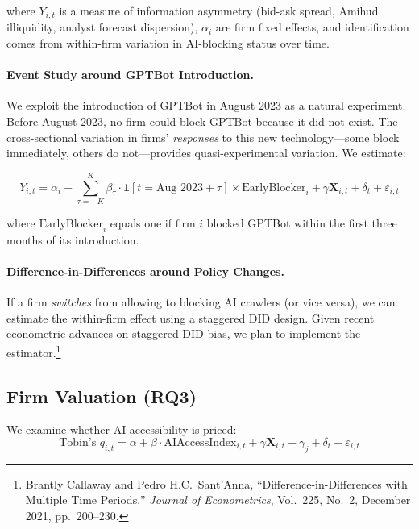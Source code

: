 \documentclass[12pt,a4paper]{article}
\begin{document}
\noindent where $Y_{i,t}$ is a measure of information asymmetry (bid-ask spread, Amihud illiquidity, analyst forecast dispersion), $\alpha_i$ are firm fixed effects, and identification comes from within-firm variation in AI-blocking status over time.

\paragraph{Event Study around GPTBot Introduction.}
We exploit the introduction of GPTBot in August 2023 as a natural experiment. Before August 2023, no firm could block GPTBot because it did not exist. The cross-sectional variation in firms' \emph{responses} to this new technology---some block immediately, others do not---provides quasi-experimental variation. We estimate:

\begin{equation}
Y_{i,t} = \alpha_i + \sum_{\tau = -K}^{K} \beta_\tau \cdot \mathbf{1}[t = \text{Aug 2023} + \tau] \times \text{EarlyBlocker}_{i} + \gamma \mathbf{X}_{i,t} + \delta_t + \varepsilon_{i,t}
\end{equation}

\noindent where $\text{EarlyBlocker}_{i}$ equals one if firm $i$ blocked GPTBot within the first three months of its introduction.

\paragraph{Difference-in-Differences around Policy Changes.}
If a firm \emph{switches} from allowing to blocking AI crawlers (or vice versa), we can estimate the within-firm effect using a staggered DID design. Given recent econometric advances on staggered DID bias, we plan to implement the \citet{CallawayS2021} estimator.\footnote{Brantly Callaway and Pedro H.C.\ Sant'Anna, ``Difference-in-Differences with Multiple Time Periods,'' \emph{Journal of Econometrics}, Vol.\ 225, No.\ 2, December 2021, pp.\ 200--230.}

\subsection{Firm Valuation (RQ3)}

We examine whether AI accessibility is priced:
\begin{equation}
\text{Tobin's } q_{i,t} = \alpha + \beta \cdot \text{AIAccessIndex}_{i,t} + \gamma \mathbf{X}_{i,t} + \gamma_j + \delta_t + \varepsilon_{i,t}
\end{equation}
\end{document}
